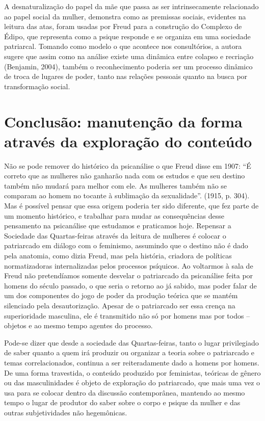 A desnaturalização do papel da mãe que passa as ser intrinsecamente
relacionado ao papel social da mulher, demonstra como as premissas
sociais, evidentes na leitura das atas, foram usadas por Freud para a
construção do Complexo de Édipo, que representa como a psique responde e
se organiza em uma sociedade patriarcal. Tomando como modelo o que
acontece nos consultórios, a autora sugere que assim como na análise
existe uma dinâmica entre colapso e recriação (Benjamin, 2004), também o
reconhecimento poderia ser um processo dinâmico de troca de lugares de
poder, tanto nas relações pessoais quanto na busca por transformação
social.

\section{Conclusão: manutenção da forma através da exploração do
conteúdo}

Não se pode remover do histórico da psicanálise o que Freud disse em
1907: ``É correto que as mulheres não ganharão nada com os estudos e que
seu destino também não mudará para melhor com ele. As mulheres também
não se comparam ao homem no tocante à sublimação da sexualidade''.
(1915, p. 304). Mas é possível pensar que essa origem poderia ter sido
diferente, que fez parte de um momento histórico, e trabalhar para mudar
as consequências desse pensamento na psicanálise que estudamos e
praticamos hoje. Repensar a Sociedade das Quartas-feiras através da
leitura de mulheres é colocar o patriarcado em diálogo com o feminismo,
assumindo que o destino não é dado pela anatomia, como dizia Freud, mas
pela história, criadora de políticas normatizadoras internalizadas pelos
processos psíquicos. Ao voltarmos à sala de Freud não pretendíamos
somente desvelar o patriarcado da psicanálise feita por homens do século
passado, o que seria o retorno ao já sabido, mas poder falar de um dos
componentes do jogo de poder da produção teórica que se mantém
silenciado pela desautorização. Apesar de o patriarcado ser essa crença
na superioridade masculina, ele é transmitido não só por homens mas por
todos -- objetos e ao mesmo tempo agentes do processo.

Pode-se dizer que desde a sociedade das Quartas-feiras, tanto o lugar
privilegiado de saber quanto a quem irá produzir ou organizar a teoria
sobre o patriarcado e temas correlacionados, continua a ser
reiteradamente dado a homens por homens. De uma forma travestida, o
conteúdo produzido por feministas, teóricas de gênero ou das
masculinidades é objeto de exploração do patriarcado, que mais uma vez o
usa para se colocar dentro da discussão contemporânea, mantendo ao mesmo
tempo o lugar de produtor do saber sobre o corpo e psique da mulher e
das outras subjetividades não hegemônicas.

